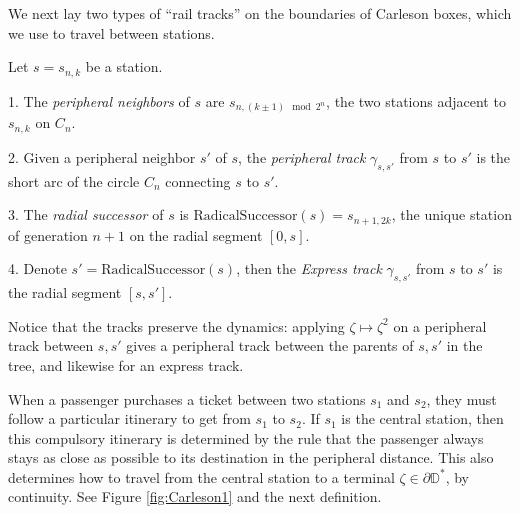 We next lay two types of \enquote{rail tracks} on the boundaries of Carleson boxes, which we use to travel between stations.

\begin{definition}
Let $s=s_{n,k}$ be a station.

1. The \emph{peripheral neighbors} of $s$ are $s_{n,\left(k\pm1\right)\mod2^{n}}$,
the two stations adjacent to $s_{n,k}$ on $C_{n}$.

2. Given a peripheral neighbor $s'$ of $s$, the \emph{peripheral
	track }$\gamma_{s,s'}$ from $s$ to $s'$
is the short arc of the circle $C_{n}$ connecting $s$ to $s'$.

3. The \emph{radial successor} of $s$ is $\mathrm{RadicalSuccessor}(s)=s_{n+1,2k}$, the unique station of generation $n+1$ on the radial segment $[0,s]$.

4. Denote $s'=\mathrm{RadicalSuccessor}(s)$, then the \emph{Express track} $\gamma_{s,s'}$ from $s$ to $s'$ is the radial segment $[s,s']$.

\end{definition}

Notice that the tracks preserve the dynamics: applying $\zeta\mapsto \zeta^{2}$
on a peripheral track between $s,s'$ gives a peripheral track between the
parents of $s,s'$ in the tree, and likewise for an express track.

When a passenger purchases a ticket between two stations $s_1$ and $s_2$, they must follow a particular itinerary to get from $s_1$ to $s_2$.
If $s_1$ is the central station, then this compulsory itinerary is determined by the rule that the passenger always stays as close as possible to its destination in the peripheral distance. 
This also determines how to travel from the central station to a terminal $\zeta\in \partial \mathbb D^*$, by continuity. See Figure \ref{fig:Carleson1} and the next definition.


